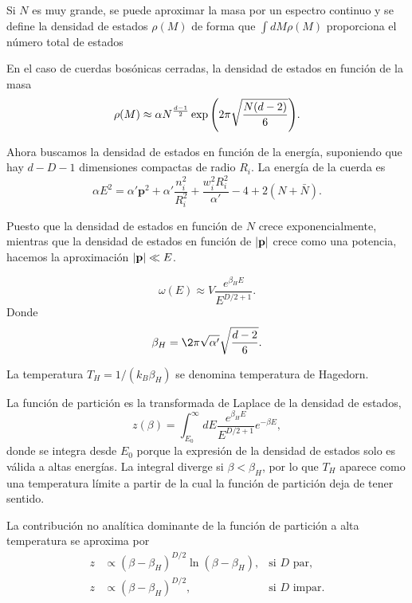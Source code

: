 Si $N$ es muy grande, se puede aproximar la masa por un espectro continuo y se define la
densidad de estados $\rho(M)$ de forma que $\int dM \rho(M)$ proporciona el número total
de estados 

En el caso de cuerdas bosónicas cerradas, la densidad de estados en función de la masa
\begin{equation}
  \rho(M)\approx \alpha N^ {\frac{d-1}{2}}\exp\qty(2\pi\sqrt{\frac{N(d-2)}{6}}).
\end{equation}

Ahora buscamos la densidad de estados en función de la energía, suponiendo que hay $d-D-1$ dimensiones compactas 
de radio $R_i$.
La energía de la cuerda es
\begin{equation}
  \alpha E^2 = \alpha' \mathbf p ^2 + \alpha'\frac{n^2_i}{R_i^2} + \frac{w_i^2 R^2_i}{\alpha'} -4+ 2(N+\bar N).
\end{equation}

Puesto que la densidad de estados en función de $N$ crece exponencialmente, mientras 
que la densidad de estados en función de $\abs{\mathbf p}$ crece como una potencia,
hacemos la aproximación $\abs{\mathbf p} \ll E$.



\begin{equation}
  \omega(E) \approx V \frac{e^{\beta_H E}}{E^{D/2+1}}.
\end{equation}
Donde 
\begin{equation}
  \beta_H = \2\pi \sqrt{\alpha'}\sqrt{\frac{d-2}{6}}.
\end{equation}

La temperatura $T_H=1/(k_B \beta_H)$ se denomina temperatura de Hagedorn.

La función de partición es la transformada de Laplace de la densidad de estados,
\begin{equation}
  z(\beta)=\int^\infty_{E_0} dE \frac{e^{\beta_H E}}{{E^{D/2+1}}}e^{-\beta E},
\end{equation}
donde se integra desde $E_0$ porque la expresión de la densidad de estados solo es válida a altas
energías.
La integral diverge si $\beta < \beta_H$, por lo que $T_H$ aparece como una temperatura límite
a partir de la cual la función de partición deja de tener sentido.

La contribución no analítica dominante de la función de partición a alta temperatura se aproxima
por 
\begin{equation}
  \begin{aligned}
    z&\propto(\beta-\beta_H)^{D/2}\ln(\beta-\beta_H), &\text{si $D$ par,}\\
    z&\propto(\beta-\beta_H)^{D/2}, &\text{si $D$ impar}.
  \end{aligned}
  \label{eq:zp}
\end{equation}

